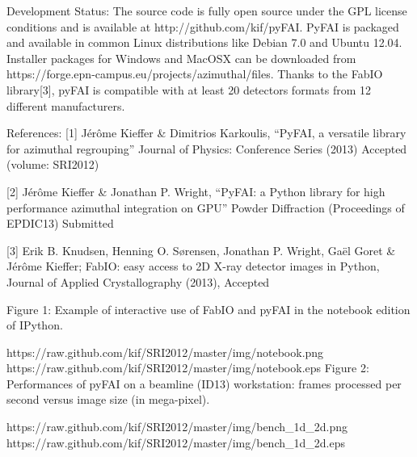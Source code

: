 Development Status: The source code is fully open source under the GPL license conditions and is available at http://github.com/kif/pyFAI. 
PyFAI is packaged and available in common Linux distributions like Debian 7.0 and Ubuntu 12.04. 
Installer packages for Windows and MacOSX can be downloaded from https://forge.epn-campus.eu/projects/azimuthal/files. 
Thanks to the FabIO library[3], pyFAI is compatible with at least 20 detectors formats from 12 different manufacturers. 

References:
[1] Jérôme Kieffer & Dimitrios Karkoulis,
	“PyFAI, a versatile library for azimuthal regrouping”
	Journal of Physics: Conference Series (2013)
	Accepted (volume: SRI2012)

[2] 	Jérôme Kieffer & Jonathan P. Wright,
	“PyFAI: a Python library for high performance azimuthal integration on GPU”
	Powder Diffraction (Proceedings of EPDIC13)
	Submitted

[3] Erik B. Knudsen, Henning O. Sørensen,  Jonathan P. Wright, Gaël Goret & Jérôme Kieffer;
	FabIO: easy access to 2D X-ray detector images in Python,
    	Journal of Applied Crystallography (2013),
    	Accepted


Figure 1: Example of interactive use of FabIO and pyFAI in the notebook edition
of IPython.

https://raw.github.com/kif/SRI2012/master/img/notebook.png
https://raw.github.com/kif/SRI2012/master/img/notebook.eps
Figure 2: Performances of pyFAI on a beamline (ID13) workstation: frames processed per second versus image size (in mega-pixel).

https://raw.github.com/kif/SRI2012/master/img/bench_1d_2d.png
https://raw.github.com/kif/SRI2012/master/img/bench_1d_2d.eps
